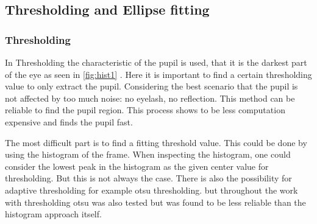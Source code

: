 \subsection{Thresholding and Ellipse fitting}
\subsubsection{Thresholding}
In Thresholding the characteristic of the pupil is used, that it is the darkest part of the eye as seen in \ref{fig:hist1} . Here it is important to find a certain thresholding value to only extract the pupil. Considering the best scenario that the pupil is not affected by too much noise: no eyelash, no reflection. This method can be reliable to find the pupil region. This process shows to be less computation expensive and finds the pupil fast. 

The most difficult part is to find a fitting threshold value. This could be done by using the histogram of the frame. When inspecting the histogram, one could consider the lowest peak in the histogram as the given center value for thresholding. But this is not always the case. There is also the possibility for adaptive thresholding for example otsu thresholding. but throughout the work with thresholding otsu was also tested but was found to be less reliable than the histogram approach itself. 

